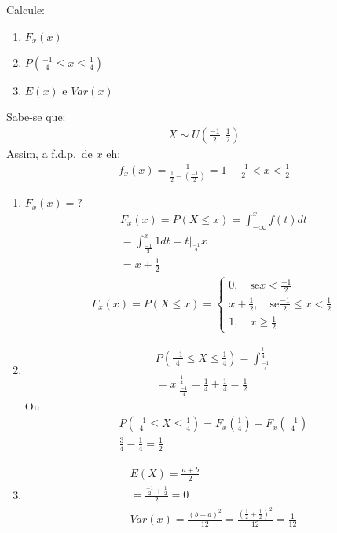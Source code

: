 \begin{description}
     Calcule:
\begin{enumerate}[label=(\alph*)]
  \item $F_{x} (x)$
  \item $P(\frac{-1}{4} \leq x \leq \frac{1}{4})$
  \item $E(x)$ e $Var(x)$
\end{enumerate}
Sabe-se que:
\begin{align*}
  X \mathtt{\sim}  U(\frac{-1}{2}; \frac{1}{2})
\end{align*}
Assim, a f.d.p.\ de $x$ eh:
\begin{align*}
  f_{x} (x)= \frac{1}{\frac{1}{2}- \left( \frac{-1}{2}\right)} = 1 \quad \frac{-1}{2}<x<\frac{1}{2}
\end{align*}
\begin{enumerate}[label=(\alph*)]
  \item  $F_{x}(x)=?$
    \begin{align*}
      F_{x} (x)= P(X \leq x) = \int_{ -\infty  }^{x} f(t)dt\\
      = \int_{\frac{-1}{2}}^{x} 1 dt= t|_{\frac{-1}{2}}{x} \\
      = x+ \frac{1}{2}
    \end{align*}
    \begin{align*}
      F_{x} (x) = P(X \leq x) = \begin{cases}
        0, \quad \text{se}  x< \frac{-1}{2} \\
        x+ \frac{1}{2} , \quad \text{se} \frac{-1}{2} \leq x < \frac{1}{2} \\
        1, \quad x \ge \frac{1}{2}
      \end{cases}
    \end{align*}
    \item 
      \begin{align*}
      P(\frac{-1}{4}\leq X \leq \frac{1}{4})  = \int_{\frac{-1}{4}}^{\frac{1}{4}}\\
      = x|_{\frac{-1}{4}}^{\frac{1}{4}}= \frac{1}{4}+\frac{1}{4}=\frac{1}{2}
    \end{align*}
    Ou 
    \begin{align*}
      P(\frac{-1}{4} \leq X \leq \frac{1}{4})= F_{x}(\frac{1}{4})-F_{x}(\frac{-1}{4}) \\
      \frac{3}{4}- \frac{1}{4}= \frac{1}{2}
    \end{align*}
    \item 
      \begin{align*}
        E(X) = \frac{a+b}{2} \\
        = \frac{\frac{-1}{2} + \frac{1}{2}}{2}=0\\
        Var(x)= \frac{ \left( b-a \right)^2 }{12}= \frac{ \left( \frac{1}{2} + \frac{1}{2} \right)^2 }{12}= \frac{1}{12}
      \end{align*}
\end{enumerate}

   \end{description}
